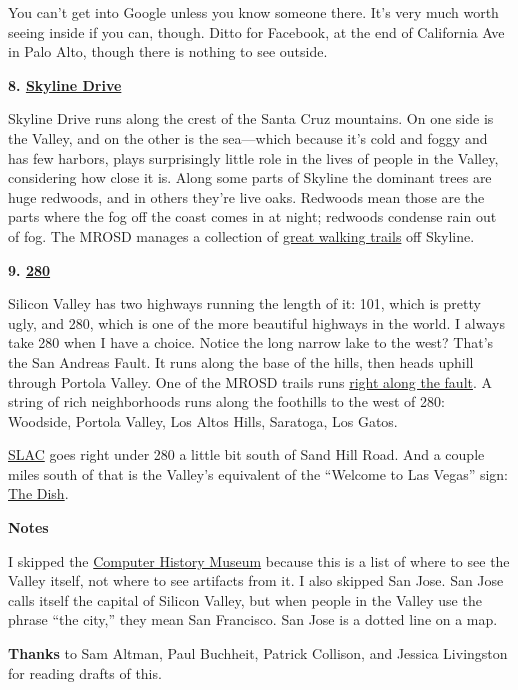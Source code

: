 You can't get into Google unless you know someone there. It's very much
worth seeing inside if you can, though. Ditto for Facebook, at the end
of California Ave in Palo Alto, though there is nothing to see outside.

\textbf{8. \href{http://maps.google.com/maps?q=skylonda}{Skyline Drive}}

Skyline Drive runs along the crest of the Santa Cruz mountains. On one
side is the Valley, and on the other is the sea---which because it's
cold and foggy and has few harbors, plays surprisingly little role in
the lives of people in the Valley, considering how close it is. Along
some parts of Skyline the dominant trees are huge redwoods, and in
others they're live oaks. Redwoods mean those are the parts where the
fog off the coast comes in at night; redwoods condense rain out of fog.
The MROSD manages a collection of \href{http://www.openspace.org/}{great
walking trails} off Skyline.

\textbf{9.
\href{http://maps.google.com/maps?q=interstate+280+san+mateo}{280}}

Silicon Valley has two highways running the length of it: 101, which is
pretty ugly, and 280, which is one of the more beautiful highways in the
world. I always take 280 when I have a choice. Notice the long narrow
lake to the west? That's the San Andreas Fault. It runs along the base
of the hills, then heads uphill through Portola Valley. One of the MROSD
trails runs
\href{http://www.openspace.org/preserves/pr_los_trancos.asp}{right along
the fault}. A string of rich neighborhoods runs along the foothills to
the west of 280: Woodside, Portola Valley, Los Altos Hills, Saratoga,
Los Gatos.

\href{http://www.flickr.com/photos/38037974@N00/3890299362/}{SLAC} goes
right under 280 a little bit south of Sand Hill Road. And a couple miles
south of that is the Valley's equivalent of the ``Welcome to Las Vegas''
sign: \href{http://www.flickr.com/photos/paulbarroga/3443486941/}{The
Dish}.

\textbf{Notes}

I skipped the \href{http://www.computerhistory.org/}{Computer History
Museum} because this is a list of where to see the Valley itself, not
where to see artifacts from it. I also skipped San Jose. San Jose calls
itself the capital of Silicon Valley, but when people in the Valley use
the phrase ``the city,'' they mean San Francisco. San Jose is a dotted
line on a map.

\textbf{Thanks} to Sam Altman, Paul Buchheit, Patrick Collison, and
Jessica Livingston for reading drafts of this.
